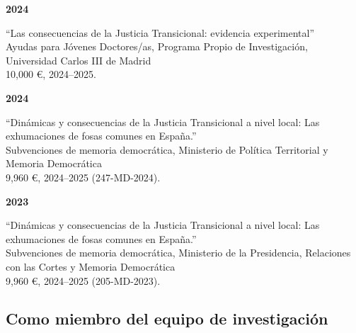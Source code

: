 \documentclass[a4paper, 12pt]{article}
\begin{document}
\noindent
\begin{minipage}[t]{0.1\textwidth}
\textbf{2024}
\end{minipage}\hfill\begin{minipage}[t]{0.9\textwidth}
``Las consecuencias de la Justicia Transicional: evidencia experimental''\\
Ayudas para Jóvenes Doctores/as, Programa Propio de Investigación, Universidad Carlos III de Madrid\\
10,000 €, 2024--2025.\\\vspace{-8pt} %
\end{minipage}
\begin{minipage}[t]{0.1\textwidth}
\textbf{2024}
\end{minipage}\hfill\begin{minipage}[t]{0.9\textwidth}
``Dinámicas y consecuencias de la Justicia Transicional a nivel local: Las exhumaciones de fosas comunes en España.''\\
Subvenciones de memoria democrática, Ministerio de Política Territorial y Memoria Democrática\\
9,960 €, 2024--2025 (247-MD-2024).\\\vspace{-8pt} %
\end{minipage}
\begin{minipage}[t]{0.1\textwidth}
\textbf{2023}
\end{minipage}\hfill\begin{minipage}[t]{0.9\textwidth}
``Dinámicas y consecuencias de la Justicia Transicional a nivel local: Las exhumaciones de fosas comunes en España.''\\
Subvenciones de memoria democrática, Ministerio de la Presidencia, Relaciones con las Cortes y Memoria Democrática\\
9,960 €, 2024--2025 (205-MD-2023).\\\vspace{-8pt} %
\end{minipage}

\subsection*{Como miembro del equipo de investigación}
\end{document}
